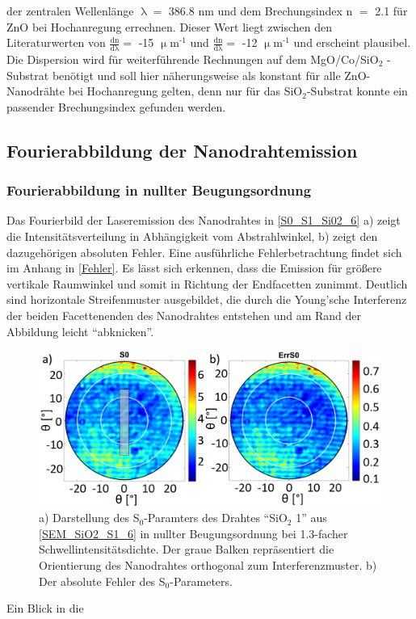 der zentralen Wellenlänge $\uplambda=$ 386.8 nm und dem \mbox{Brechungsindex} n
$=$ 2.1 für ZnO bei Hochanregung \cite{Wille.2016} errechnen. Dieser Wert liegt
zwischen den Literaturwerten von $\frac{\text{dn}}{\text{d}\uplambda}=$ -15
$\upmu$m$^\text{-1}$ \cite{O.Madelung.1984} und
$\frac{\text{dn}}{\text{d}\uplambda}=$ -12 $\upmu$m$^\text{-1}$
\cite{Zimmler.2010} und erscheint plausibel. Die Dispersion wird für
weiterführende Rechnungen auf dem MgO/Co/SiO$_\text{2}$ - Substrat benötigt und
soll hier näherungsweise als konstant für alle ZnO-Nanodrähte bei Hochanregung
gelten, denn nur für das SiO$_\text{2}$-Substrat konnte ein passender
Brechungsindex gefunden werden. \subsection{Fourierabbildung der
Nanodrahtemission} \subsubsection{Fourierabbildung in nullter Beugungsordnung}
Das Fourierbild der Laseremission des Nanodrahtes in \autoref{S0_S1_Si02_6} a)
zeigt die Intensitätsverteilung in Abhängigkeit vom Abstrahlwinkel, b) zeigt den
dazugehörigen absoluten Fehler. Eine ausführliche Fehlerbetrachtung findet sich
im Anhang in \autoref{Fehler}. Es lässt sich erkennen, dass die Emission für
größere vertikale Raumwinkel und somit in Richtung der Endfacetten zunimmt.
Deutlich sind horizontale Streifenmuster ausgebildet, die durch die Young'sche
Interferenz der beiden Facettenenden des Nanodrahtes entstehen und am Rand der
Abbildung leicht ``abknicken''.\begin{figure}[h] \centering
\includegraphics[width=.55\textwidth]{Bilder/SiO2/S0_S1_Si02_6} \caption{a)
Darstellung des S$_\text{0}$-Paramters des Drahtes ``SiO$_\text{2}$ 1'' aus
\autoref{SEM_SiO2_S1_6} in nullter Beugungsordnung bei 1.3-facher
Schwellintensitätsdichte. Der graue Balken repräsentiert die Orientierung des
Nanodrahtes orthogonal zum Interferenzmuster. b) Der absolute Fehler des
S$_\text{0}$-Parameters.} \label{S0_S1_Si02_6} \end{figure} Ein Blick in die
